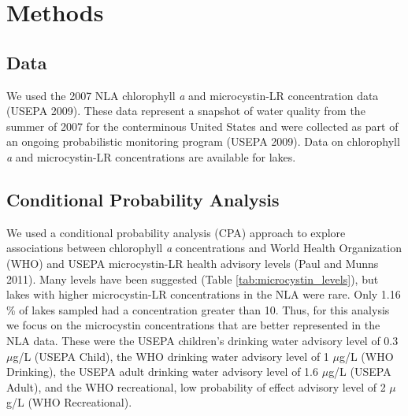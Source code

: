 \documentclass[11pt,]{article}
\begin{document}
\section{Methods}\label{methods}

\subsection{Data}\label{data}

We used the 2007 NLA chlorophyll \emph{a} and microcystin-LR
concentration data (USEPA 2009). These data represent a snapshot of
water quality from the summer of 2007 for the conterminous United States
and were collected as part of an ongoing probabilistic monitoring
program (USEPA 2009). Data on chlorophyll \emph{a} and microcystin-LR
concentrations are available for lakes.

\subsection{Conditional Probability
Analysis}\label{conditional-probability-analysis}

We used a conditional probability analysis (CPA) approach to explore
associations between chlorophyll \emph{a} concentrations and World
Health Organization (WHO) and USEPA microcystin-LR health advisory
levels (Paul and Munns 2011). Many levels have been suggested (Table
\ref{tab:microcystin_levels}), but lakes with higher microcystin-LR
concentrations in the NLA were rare. Only 1.16 \% of lakes sampled had a
concentration greater than 10. Thus, for this analysis we focus on the
microcystin concentrations that are better represented in the NLA data.
These were the USEPA children's drinking water advisory level of 0.3
\(\mu\)g/L (USEPA Child), the WHO drinking water advisory level of 1
\(\mu\)g/L (WHO Drinking), the USEPA adult drinking water advisory level
of 1.6 \(\mu\)g/L (USEPA Adult), and the WHO recreational, low
probability of effect advisory level of 2 \(\mu\)g/L (WHO Recreational).
\end{document}
